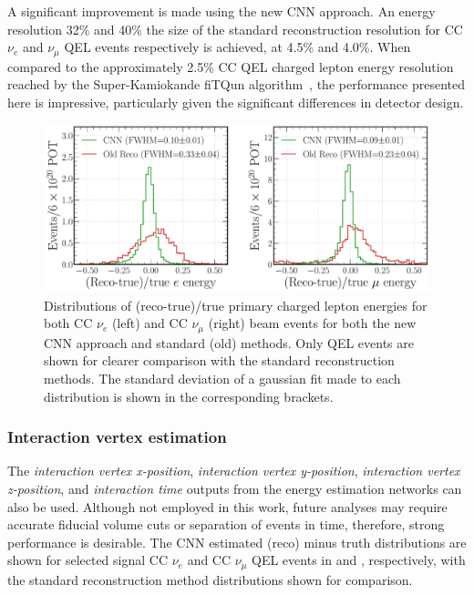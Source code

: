 A significant improvement is made using the new CNN approach. An energy resolution 32\% and 40\%
the size of the standard reconstruction resolution for CC $\nu_{e}$ and $\nu_{\mu}$ QEL events
respectively is achieved, at 4.5\% and 4.0\%. When compared to the approximately 2.5\% CC QEL
charged lepton energy resolution reached by the Super-Kamiokande fiTQun
algorithm~\cite{jiang2019}, the performance presented here is impressive, particularly given the
significant differences in detector design.

\begin{figure} %
    \includegraphics[width=\textwidth]{diagrams/7-results/final_frac_e_comparison.pdf}
    \caption[Distributions of (reco-true)/true primary charged lepton energies for the CNN and
        standard methods] {Distributions of (reco-true)/true primary charged lepton energies for
        both CC $\nu_{e}$ (left) and CC $\nu_{\mu}$ (right) beam events for both the new CNN
        approach and standard (old) methods. Only QEL events are shown for clearer comparison with
        the standard reconstruction methods. The standard deviation of a gaussian fit made to each
        distribution is shown in the corresponding brackets.}
    \label{fig:final_frac_e_comparison}
\end{figure}

\subsubsection*{Interaction vertex estimation} %

The \emph{interaction vertex x-position}, \emph{interaction vertex y-position}, \emph{interaction
    vertex z-position}, and \emph{interaction time} outputs from the energy estimation networks
    can also be used. Although not employed in this work, future analyses may require accurate
    fiducial volume cuts or separation of events in time, therefore, strong performance is
    desirable. The CNN estimated (reco) minus truth distributions are shown for selected signal CC
    $\nu_{e}$ and CC $\nu_{\mu}$ QEL events in 
    and , respectively, with the standard
    reconstruction method distributions shown for comparison.

